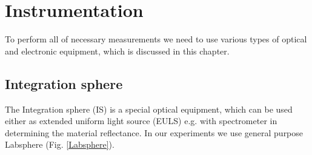 
\chapter{Instrumentation}
To perform all of necessary measurements we need to use various types of optical and electronic equipment, which is discussed in this chapter.
\section{Integration sphere}
The Integration sphere (IS) is a special optical equipment, which can be used either as extended uniform light source (EULS) e.g. with spectrometer in determining the material reflectance. In our experiments we use general purpose Labsphere (Fig. \ref{Labsphere}).

